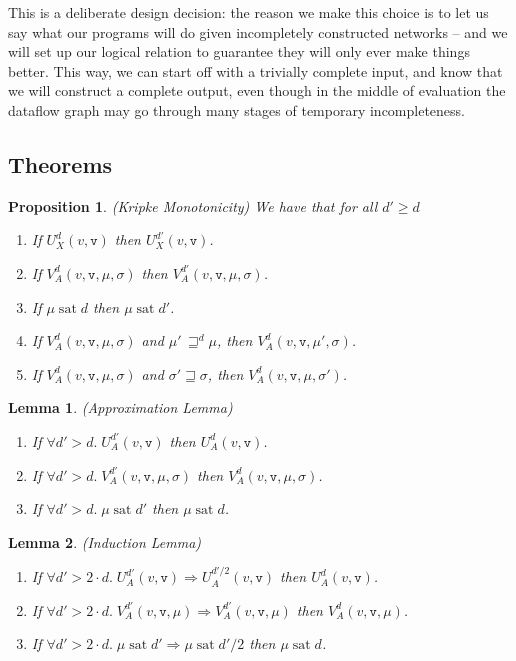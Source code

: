\documentclass[preprint]{sigplanconf}
\newcommand{\betterstate}[3]{{#2}\, {\sqsupseteq}^{#1} {#3}}
\renewcommand{\implies}{\Rightarrow}
\newcommand{\term}[1]{\ensuremath{\mathtt{{#1}}}}
\newcommand{\satisfy}[2]{{#1}\;\mathrm{sat}\;{#2}}
\newtheorem{prop}{Proposition}
\newtheorem{lemma}{Lemma}
\begin{document}
This is a deliberate design decision: the reason we make this choice
is to let us say what our programs will do given incompletely
constructed networks -- and we will set up our logical relation to
guarantee they will only ever make things better. This way, we can
start off with a trivially complete input, and know that we will
construct a complete output, even though in the middle of evaluation
the dataflow graph may go through many stages of temporary
incompleteness.


\subsection{Theorems}

\begin{prop}{(Kripke Monotonicity)}
We have that for all $d' \geq d$
\begin{enumerate}
\item If $U^d_X(v, \term{v})$ then $U^{d'}_X(v, \term{v})$. 
\item If $V^d_A(v, \term{v}, \mu, \sigma)$ then $V^{d'}_A(v, \term{v}, \mu, \sigma)$. 
\item If $\satisfy{\mu}{d}$ then $\satisfy{\mu}{d'}$. 
\item If $V^d_A(v, \term{v}, \mu, \sigma)$ and $\betterstate{d}{\mu'}{\mu}$, then $V^d_A(v, \term{v}, \mu',\sigma)$.
\item If $V^d_A(v, \term{v}, \mu, \sigma)$ and $\sigma' \sqsupseteq \sigma$, then $V^d_A(v, \term{v}, \mu,\sigma')$.
\end{enumerate}
\end{prop}

\begin{lemma}{(Approximation Lemma)}
\begin{enumerate}
  \item If $\forall d' > d.\; U^{d'}_A(v, \term{v})$ then $U^d_A(v, \term{v})$. 
  \item If $\forall d' > d.\; V^{d'}_A(v, \term{v}, \mu, \sigma)$ then $V^d_A(v, \term{v}, \mu, \sigma)$. 
  \item If $\forall d' > d.\; \satisfy{\mu}{d'}$ then $\satisfy{\mu}{d}$. 
\end{enumerate}
\end{lemma}

\begin{lemma}{(Induction Lemma)}
\begin{enumerate}
  \item If $\forall d' > 2\cdot d.\; U^{d'}_A(v, \term{v}) \implies U^{d'/2}_A(v, \term{v})$ then $U^d_A(v, \term{v})$. 
  \item If $\forall d' > 2\cdot d.\; V^{d'}_A(v, \term{v}, \mu) \implies V^{d'}_A(v, \term{v}, \mu)$ then $V^d_A(v, \term{v}, \mu)$. 
  \item If $\forall d' > 2\cdot d.\; \satisfy{\mu}{d'} \implies \satisfy{\mu}{d'/2}$ then $\satisfy{\mu}{d}$. 
\end{enumerate}
\end{lemma}
\end{document}
